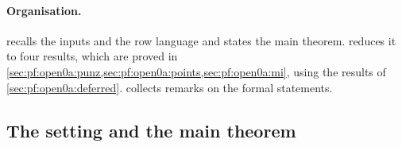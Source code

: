 \paragraph{Organisation.}
 recalls the inputs and the row language and states the main theorem.
 reduces it to four results, which are proved in
\cref{sec:pf:open0a:punz,sec:pf:open0a:points,sec:pf:open0a:mi}, using the results of
\cref{sec:pf:open0a:deferred}.  collects remarks on the formal statements.

\subsection{The setting and the main theorem}\label{sec:pf:open0a:setup}

